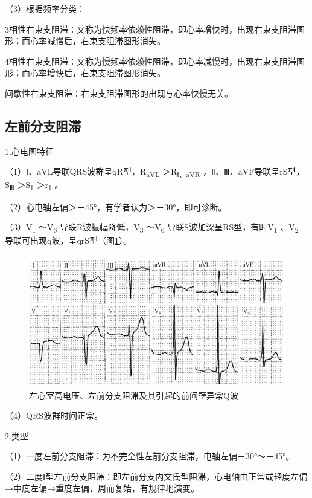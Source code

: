 （3）根据频率分类：

3相性右束支阻滞：又称为快频率依赖性阻滞，即心率增快时，出现右束支阻滞图形；而心率减慢后，右束支阻滞图形消失。

4相性右束支阻滞：又称为慢频率依赖性阻滞，即心率减慢时，出现右束支阻滞图形；而心率增快后，右束支阻滞图形消失。

间歇性右束支阻滞：右束支阻滞图形的出现与心率快慢无关。

\protect\hypertarget{text00028.htmlux5cux23subid346}{}{}

\subsection{左前分支阻滞}

1.心电图特征

（1）Ⅰ、aVL导联QRS波群呈qR型，R\textsubscript{aVL}
＞R\textsubscript{Ⅰ、aVR} ，Ⅱ、Ⅲ、aVF导联呈rS型，S\textsubscript{Ⅲ}
＞S\textsubscript{Ⅱ} ＞r\textsubscript{Ⅱ} 。

（2）心电轴左偏＞－45°，有学者认为＞－30°，即可诊断。

（3）V\textsubscript{1} ～V\textsubscript{6}
导联R波振幅降低，V\textsubscript{3} ～V\textsubscript{6}
导联S波加深呈RS型，有时V\textsubscript{1} 、V\textsubscript{2}
导联可出现q波，呈qrS型（图\ref{fig21-7}）。

\begin{figure}[!htbp]
 \centering
 \includegraphics[width=4.625in,height=2.27083in]{./images/Image00355.jpg}
 \captionsetup{justification=centering}
 \caption{左心室高电压、左前分支阻滞及其引起的前间壁异常Q波}
 \label{fig21-7}
  \end{figure} 

（4）QRS波群时间正常。

2.类型

（1）一度左前分支阻滞：为不完全性左前分支阻滞，电轴左偏－30°～－45°。

（2）二度Ⅰ型左前分支阻滞：即左前分支内文氏型阻滞，心电轴由正常或轻度左偏→中度左偏→重度左偏，周而复始，有规律地演变。

